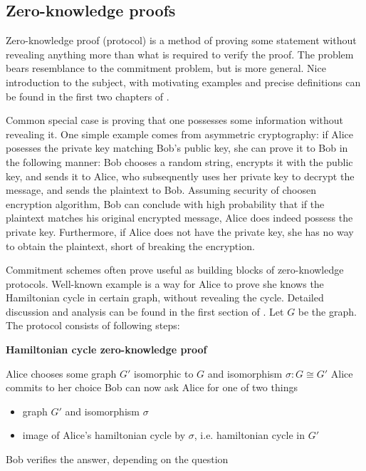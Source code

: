 \documentclass[10pt]{article}
\begin{document}
\subsection{Zero-knowledge proofs}

Zero-knowledge proof (protocol) is a method of proving some statement without revealing anything more
than what is required to verify the proof. The problem bears resemblance to the commitment problem, but
is more general. Nice introduction to the subject, with motivating examples and precise definitions can
be found in the first two chapters of \cite{MIT:StatZero}. 

Common special case is proving that one possesses some information without revealing it.
One simple example comes from asymmetric cryptography: if Alice posesses the private key matching Bob's
public key, she can prove it to Bob in the following manner: Bob chooses a random string, encrypts it
with the public key, and sends it to Alice, who subseqnently uses her private key to decrypt the message,
and sends the plaintext to Bob. Assuming security of choosen encryption algorithm, Bob can conclude 
with high probability that if the plaintext matches his original encrypted message, Alice does indeed
possess the private key. Furthermore, if Alice does not have the private key, she has no way to obtain
the plaintext, short of breaking the encryption.

Commitment schemes often prove useful as building blocks of zero-knowledge protocols. Well-known example
is a way for Alice to prove she knows the Hamiltonian cycle in certain graph, without revealing the
cycle. Detailed discussion and analysis can be found in the first section of \cite{CM:CryptoNotes}. 
Let \(G\) be the graph. The protocol consists of following steps:

\vspace{2mm}

\NoCaptionOfAlgo
\begin{algorithm}[H]
\caption{\textbf{Hamiltonian cycle zero-knowledge proof}}
  Alice chooses some graph \(G'\) isomorphic to \(G\) and isomorphism \(\sigma\colon G\cong G'\) \;
  Alice commits to her choice\;
  Bob can now ask Alice for one of two things \;
    \begin{itemize}
      \item graph \(G'\) and isomorphism \(\sigma\) \;
      \item image of Alice's hamiltonian cycle by \(\sigma\), i.e. hamiltonian cycle in \(G'\) \;
    \end{itemize}
  Bob verifies the answer, depending on the question \;
\end{algorithm}
\end{document}
